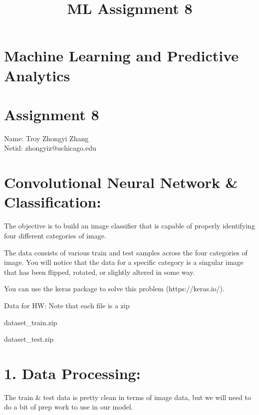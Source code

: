 \documentclass[11pt]{article}
\title{ML Assignment 8}
\begin{document}
    
    
    \maketitle
    
    

    
    \hypertarget{machine-learning-and-predictive-analytics}{%
\section{Machine Learning and Predictive
Analytics}\label{machine-learning-and-predictive-analytics}}

\hypertarget{assignment-8}{%
\section{Assignment 8}\label{assignment-8}}

    Name: Troy Zhongyi Zhang\\
Netid: zhongyiz@uchicago.edu

    \hypertarget{convolutional-neural-network-classification}{%
\section{Convolutional Neural Network \&
Classification:}\label{convolutional-neural-network-classification}}

The objective is to build an image classifier that is capable of
properly identifying four different categories of image.

The data consists of various train and test samples across the four
categories of image. You will notice that the data for a specific
category is a singular image that has been flipped, rotated, or slightly
altered in some way.

You can use the keras package to solve this problem (https://keras.io/).

Data for HW: Note that each file is a zip

dataset\_train.zip

dataset\_test.zip

    \hypertarget{data-processing}{%
\section{1. Data Processing:}\label{data-processing}}

The train \& test data is pretty clean in terms of image data, but we
will need to do a bit of prep work to use in our model.
\end{document}
